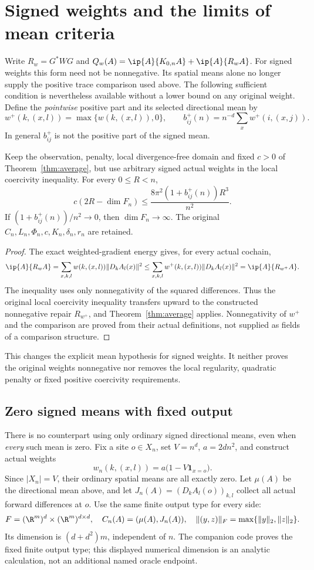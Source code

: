\section{Signed weights and the limits of mean criteria}\label{sec:signed}
Write $R_w=G^*W G$ and $Q_w(A)=\ip{A}{K_{0,n}A}+\ip{A}{R_wA}$.
For signed weights this form need not be nonnegative. Its spatial means
alone no longer supply the positive trace comparison used above.
The following sufficient condition is nevertheless available without a
lower bound on any original weight. Define the \emph{pointwise} positive part
and its selected directional mean by
\[
 w^+(k,(x,l))=\max\{w(k,(x,l)),0\},\qquad
 b^+_{ij}(n)=n^{-d}\sum_x w^+(i,(x,j)).
\]
In general $b^+_{ij}$ is not the positive part of the signed mean.

\begin{theorem}\label{thm:signed-positive}
Keep the observation, penalty, local divergence-free domain and fixed
$c>0$ of Theorem~\ref{thm:average}, but use arbitrary signed actual weights
in the local coercivity inequality. For every $0\leq R<n$,
\[
 c(2R-\dim F_n)\leq
       \frac{8\pi^2(1+b^+_{ij}(n))R^3}{n^2}.
\]
If $(1+b^+_{ij}(n))/n^2\to0$, then $\dim F_n\to\infty$.
The original $C_n,L_n,\Phi_n,c,K_n,\delta_n,r_n$ are retained.
\end{theorem}
\begin{proof}
The exact weighted-gradient energy gives, for every actual cochain,
\[
 \ip{A}{R_w A}=\sum_{x,k,l}w(k,(x,l))\|D_k A_l(x)\|^2
       \leq\sum_{x,k,l}w^+(k,(x,l))\|D_k A_l(x)\|^2
       =\ip{A}{R_{w^+}A}.
\]
The inequality uses only nonnegativity of the squared differences.
Thus the original local coercivity inequality transfers upward to the
constructed nonnegative repair $R_{w^+}$, and Theorem~\ref{thm:average}
applies. Nonnegativity of $w^+$ and the comparison are proved from their
actual definitions, not supplied as fields of a comparison structure.
\end{proof}
This changes the explicit mean hypothesis for signed weights. It neither
proves the original weights nonnegative nor removes the local regularity,
quadratic penalty or fixed positive coercivity requirements.

\subsection{Zero signed means with fixed output}
There is no counterpart using only ordinary signed directional means,
even when \emph{every} such mean is zero. Fix a site $o\in X_n$, set
$V=n^d$, $a=2dn^2$, and construct actual weights
\[
 w_n(k,(x,l))=a\bigl(1-V\mathbf1_{x=o}\bigr).
\]
Since $|X_n|=V$, their ordinary spatial means are all exactly zero.
Let $\mu(A)$ be the directional mean above, and let
$J_n(A)=(D_k A_l(o))_{k,l}$ collect all actual forward differences at $o$.
Use the same finite output type for every side:
\[
 F=(\R^m)^d\times(\R^m)^{d\times d},\quad
 C_n(A)=(\mu(A),J_n(A)),\quad
 \|(y,z)\|_F=\max\{\|y\|_2,\|z\|_2\}.
\]
Its dimension is $(d+d^2)m$, independent of $n$. The companion code proves
the fixed finite output type; this displayed numerical dimension is an
analytic calculation, not an additional named oracle endpoint.

